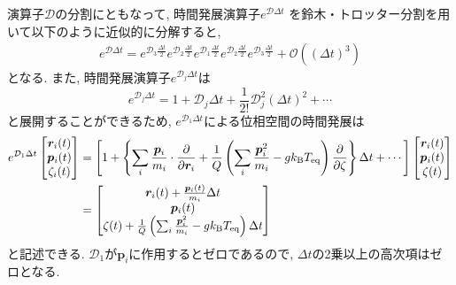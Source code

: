 演算子$\mathcal{D}$の分割にともなって, 時間発展演算子$e^{\mathcal{D} \Delta t}$
を鈴木・トロッター分割を用いて以下のように近似的に分解すると,
\begin{align}
 e^{\mathcal{D}\Delta t}
 =
 e^{\mathcal{D}_{3} \frac{\Delta t}{2}}
 e^{\mathcal{D}_{2} \frac{\Delta t}{2}}
 e^{\mathcal{D}_{1} \frac{\Delta t}{2}}
 e^{\mathcal{D}_{2} \frac{\Delta t}{2}}
 e^{\mathcal{D}_{3} \frac{\Delta t}{2}}
 +
 \mathcal{O}\left( (\Delta t)^{3} \right)
 \label{eq:NoseHoover32}
\end{align}
となる. また, 時間発展演算子$e^{\mathcal{D}_{j} \Delta t}$は
\begin{equation}
 e^{\mathcal{D}_{j} \Delta t}
 =
 1 + \mathcal{D}_{j} \Delta t
 + \frac{1}{2!} \mathcal{D}_{j}^{2} (\Delta t)^{2} + \cdots
 \label{eq:NoseHoover33}
\end{equation}
と展開することができるため, $e^{\mathcal{D}_{1} \Delta t}$による位相空間の時間発展は
\begin{align}
 e^{\mathcal{D}_{1} \Delta t}
 \begin{bmatrix}
  \bm{r}_{i} (t) \\
  \bm{p}_{i} (t) \\
  \zeta_{i} (t) \\
 \end{bmatrix}
 &= \left[
    1 + \left\{
    \sum_{i} \frac{\bm{p}_{i}}{m_{i}} \cdot \frac{\partial}{\partial \bm{r}_{i}}
    +
    \frac{1}{Q}
    \left( \sum_{i} \frac{\bm{p}^{2}_{i}}{m_{i}} - g k_{\mathrm{B}} T_{\mathrm{eq}} \right)
    \frac{\partial}{\partial \zeta}
    \right\} \Delta t
    + \cdots
 \right]
 \begin{bmatrix}
  \bm{r}_{i} (t) \\
  \bm{p}_{i} (t) \\
  \zeta (t) \\
 \end{bmatrix}
 \notag \\
 &=
 \begin{bmatrix}
  \bm{r}_{i} (t) + \frac{\bm{p}_{i}(t)}{m_{i}} \Delta t \\
  \bm{p}_{i} (t)                                            \\
  \zeta (t) + \frac{1}{Q}
  \left( \sum_{i} \frac{\bm{p}^{2}_{i}}{m_{i}} - g k_{\mathrm{B}} T_{\mathrm{eq}} \right)
  \Delta t
 \end{bmatrix}
 \label{eq:NoseHoover34}
\end{align}
と記述できる.
$\mathcal{D}_{1}$が$\bm{p}_{i}$に作用するとゼロであるので, $\Delta t$の2乗以上の高次項はゼロとなる.
